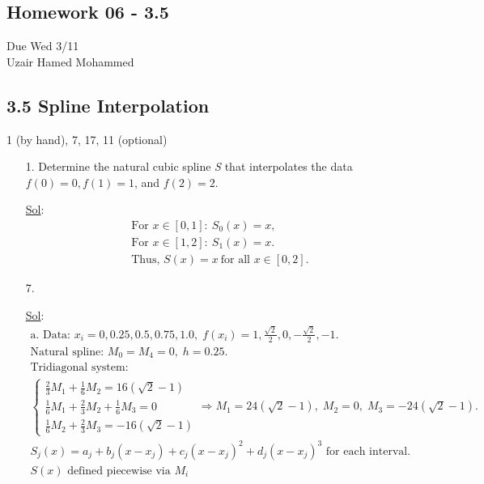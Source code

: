 \begin{center}
  \section*{Homework 06 - 3.5}
  Due Wed 3/11 \\
  Uzair Hamed Mohammed
\end{center}

\subsection*{3.5 Spline Interpolation}

1 (by hand), 7, 17, 11 (optional)

\begin{enumerate}
  \item[1.] Determine the natural cubic spline \textit{S} that
    interpolates the data \(f(0) = 0, f(1) = 1\), and \(f(2) = 2\).

    \underline{Sol}:\\

    \[
      \begin{array}{l}
        \text{For } x \in [0, 1]: \ S_0(x) = x, \\
        \text{For } x \in [1, 2]: \ S_1(x) = x. \\
        \boxed{\text{Thus, } S(x) = x \ \text{for all } x \in [0, 2].}
      \end{array}
    \]

  \item[7.]

    \underline{Sol}:\\

    \[
      \begin{array}{l}
        \text{a. Data: } x_i = 0, 0.25, 0.5, 0.75, 1.0,\; f(x_i) = 1,
        \frac{\sqrt{2}}{2}, 0, -\frac{\sqrt{2}}{2}, -1. \\[6pt]
        \text{Natural spline: } M_0 = M_4 = 0,\; h = 0.25. \\[6pt]
        \text{Tridiagonal system:} \\
        \begin{cases}
          \frac{2}{3}M_1 + \frac{1}{6}M_2 = 16(\sqrt{2} - 1) \\
          \frac{1}{6}M_1 + \frac{2}{3}M_2 + \frac{1}{6}M_3 = 0 \\
          \frac{1}{6}M_2 + \frac{2}{3}M_3 = -16(\sqrt{2} - 1)
        \end{cases} \Rightarrow M_1 = 24(\sqrt{2} - 1),\; M_2 = 0,\;
        M_3 = -24(\sqrt{2} - 1). \\[6pt]
        S_j(x) = a_j + b_j(x - x_j) + c_j(x - x_j)^2 + d_j(x - x_j)^3
        \text{ for each interval.} \\[6pt]
        \boxed{S(x) \text{ defined piecewise via } M_i} \\[12pt]


\end{array}\]
\end{enumerate}
